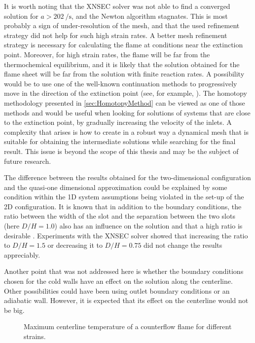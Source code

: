 It is worth noting that the XNSEC solver was not able to find a converged solution for $a > \SI{202}{\per\second}$, and the Newton algorithm stagnates. This is most probably a sign of under-resolution of the mesh, and that the used refinement strategy did not help for such high strain rates. A better mesh refinement strategy is necessary for calculating the flame at conditions near the extinction point. 
Moreover, for high strain rates, the flame will be far from the thermochemical equilibrium, and it is likely that the solution obtained for the flame sheet will be far from the solution with finite reaction rates. A possibility would be to use one of the well-known continuation methods to progressively move in the direction of the extinction point (see, for example, \textcite{nishiokaFlamecontrollingContinuationMethod1996}). The homotopy methodology presented in \cref{sec:HomotopyMethod} can be viewed as one of those methods and would be useful when looking for solutions of systems that are close to the extinction point, by gradually increasing the velocity of the inlets. A complexity that arises is how to create in a robust way a dynamical mesh that is suitable for obtaining the intermediate solutions while searching for the final result. This issue is beyond the scope of this thesis and may be the subject of future research.


The difference between the results obtained for the two-dimensional configuration and the quasi-one dimensional approximation could be explained by some condition within the 1D system assumptions being violated in the set-up of the 2D configuration. It is known that in addition to the boundary conditions, the ratio between the width of the slot and the separation between the two slots (here $D/H = 1.0$) also has an influence on the solution and that a high ratio is desirable \parencite{frouzakisTwodimensionalDirectNumerical1998}. Experiments with the XNSEC solver showed that increasing the ratio to $D/H = 1.5$  or decreasing it to $D/H = 0.75$ did not change the results appreciably.

Another point that was not addressed here is whether the boundary conditions chosen for the cold walls have an effect on the solution along the centerline. Other possibilities could have been using outlet boundary conditions or an adiabatic wall. However, it is expected that its effect on the centerline would not be big. %

\begin{figure}[t]
	\centering
	\caption{Maximum centerline temperature of a counterflow flame for different strains.}
	\label{fig:TemperatureStrainPlot}
\end{figure}
